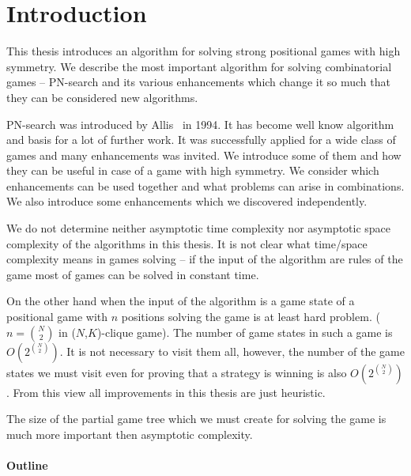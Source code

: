 \chapter*{Introduction}

This thesis introduces an algorithm for solving strong positional games
with high symmetry. We describe the most important algorithm for solving 
combinatorial games -- PN-search and its various enhancements which change
it so much that they can be considered new algorithms. 

%

\medskip

PN-search was introduced by Allis~\cite{Allis} in 1994. It has become well know algorithm
and basis for a lot of further work. It was successfully applied for a wide class
of games and many enhancements was invited. We introduce some of them and how they can be useful
in case of a game with high symmetry. We consider which  enhancements
can be used together and what problems can arise in combinations.
We also introduce some enhancements which we discovered independently.

\medskip

We do not determine neither asymptotic time complexity nor asymptotic space complexity of the algorithms in this thesis.
It is not clear what time/space complexity means in games solving -- 
if the input of the  algorithm are rules of the game most of games can be solved in constant time.

On the other hand when the input of the algorithm is a game state
of a positional game with $n$ positions solving the game is at least hard problem.
($n = {N \choose 2}$ in ($N$,$K$)-clique game). The number of game states in
such a game is  $O(2^{N \choose 2})$. It is not necessary to visit them all,
however, the number of the game states we must visit even for proving that a strategy
is winning is also $O(2^{N \choose 2})$. From this view all improvements in this
thesis are just heuristic.

The size of the partial game tree which we must create for solving the game is 
much more important then asymptotic complexity.

\subsubsection{Outline}

